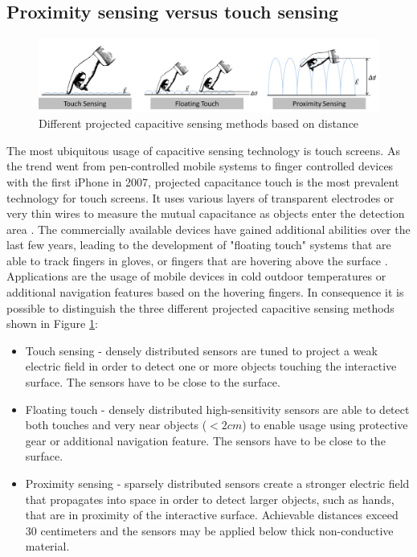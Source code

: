 \subsection{Proximity sensing versus touch sensing}
\begin{figure}[h]
\centering
\includegraphics[width=1.0\textwidth]{images/cap_projected_sensing_methods.png}
\caption{Different projected capacitive sensing methods based on distance}
\label{fig:cap_proj_sensing_methods}
\end{figure} 
The most ubiquitous usage of capacitive sensing technology is touch screens. As the trend went from pen-controlled mobile systems to finger controlled devices with the first iPhone in 2007, projected capacitance touch is the most prevalent technology for touch screens. It uses various layers of transparent electrodes or very thin wires to measure the mutual capacitance as objects enter the detection area \cite{Barrett2010}. The commercially available devices have gained additional abilities over the last few years, leading to the development of "floating touch" systems that are able to track fingers in gloves, or fingers that are hovering above the surface \cite{Cypress2012, Nokia2012}. Applications are the usage of mobile devices in cold outdoor temperatures or additional navigation features based on the hovering fingers. In consequence it is possible to distinguish the three different projected capacitive sensing methods shown in Figure \ref{fig:cap_proj_sensing_methods}:
\begin{itemize}
\item Touch sensing - densely distributed sensors are tuned to project a weak electric field in order to detect one or more objects touching the interactive surface. The sensors have to be close to the surface.
\item Floating touch - densely distributed high-sensitivity sensors are able to detect both touches and very near objects (\(<2cm\)) to enable usage using protective gear or additional navigation feature. The sensors have to be close to the surface.
\item Proximity sensing - sparsely distributed sensors create a stronger electric field that propagates into space in order to detect larger objects, such as hands, that are in proximity of the interactive surface. Achievable distances exceed 30 centimeters and the sensors may be applied below thick non-conductive material.
\end{itemize}
